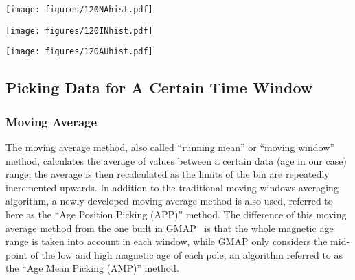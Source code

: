 \begin{figure*}
\centering
\texttt{[image: figures/120NAhist.pdf]}
\caption[Distribution of 120 Ma North American poles]{Temporal
distribution of 120 Ma $NAC$ (101) paleomagnetic poles in 10 Myr
binning and 5 Myr step. For distribution a, each bin only counts in the
midpoints of pole error bars (not including those right at bin edges); For
distribution b, as long as the bar intersects with the bin (not including those
intersecting only at one of bin edges), it is counted in. Inside the
parentheses, i means igneous rocks derived, r means sedimentary rocks with
redbeds involved derived, and m means metamorphic-dominated rocks
derived; the left are pure sedimentary rocks derived.}\label{fig-120NAhist}
\end{figure*}

\begin{figure*}
\centering
\texttt{[image: figures/120INhist.pdf]}
\caption[Distribution of 120 Ma Indian poles]{Temporal distribution
of 120 Ma Indian (501) paleomagnetic poles. See
Fig.~\ref{fig-120NAhist} for more information.}\label{fig-120INhist}
\end{figure*}

\begin{figure*}
\centering
\texttt{[image: figures/120AUhist.pdf]}
\caption[Distribution of 120 Ma Australian poles]{Temporal
distribution of 120 Ma Australian (801) paleomagnetic poles. See
Fig.~\ref{fig-120NAhist} for more information.}\label{fig-120AUhist}
\end{figure*}

\subsection{Picking Data for A Certain Time Window}

\subsubsection{Moving Average}

The moving average method, also called ``running mean'' or ``moving
window''~\cite{T08} method, calculates the average of values between a certain
data (age in our case) range; the average is then recalculated as the limits of
the bin are repeatedly incremented upwards. In addition to the traditional
moving windows averaging algorithm, a newly developed moving average method is
also used, referred to here as the ``Age Position Picking (APP)'' method. The
difference of this moving average method from the one built in
GMAP~\cite{T99,T08} is that the whole magnetic age range is taken into account
in each window, while GMAP only considers the mid-point of the low and high
magnetic age of each pole, an algorithm referred to as the ``Age Mean Picking
(AMP)'' method.

